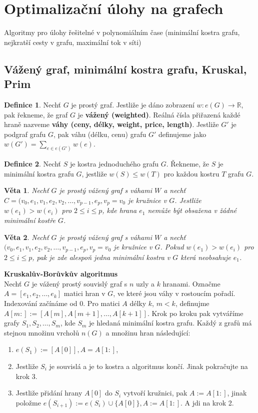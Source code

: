 \documentclass[a4]{report}
\newtheorem{theorem}{Věta}
\theoremstyle{definition}
\newtheorem{definition}{Definice}[section]
\begin{document}
\section{Optimalizační úlohy na grafech}
Algoritmy pro úlohy řešitelné v polynomiálním čase (minimální kostra grafu, nejkratší cesty v grafu, maximální tok v síti)
\subsection{Vážený graf, minimální kostra grafu, Kruskal, Prim}

\begin{definition}
Nechť $G$ je prostý graf. Jestliže je dáno zobrazení $w: e(G) \rightarrow \mathbb{R}$, pak řekneme, že graf $G$ je \textbf{vážený (weighted)}. Reálná čísla přiřazená každé hraně nazveme \textbf{váhy (ceny, délky, weight, price, length)}. Jestliže $G'$ je podgraf grafu $G$, pak váhu (délku, cenu) grafu $G'$ definujeme jako $w(G') = \sum_{e \in e(G')} w(e)$.
\end{definition}

\begin{definition}
Nechť $S$ je kostra jednoduchého grafu $G$. Řekneme, že $S$ je minimální kostra grafu $G$, jestliže $w(S) \leq w(T)$ pro každou kostru $T$ grafu $G$.
\end{definition}

\begin{theorem}
Nechť $G$ je prostý vážený graf s váhami $W$ a nechť $C = (v_0, e_1, v_1, e_2, v_2, \ldots, v_{p-1}, e_p, v_p = v_0$ je kružnice v $G$. Jestliže $w(e_1) > w(e_i)$ pro $2\leq i \leq p$, kde hrana $e_1$ nemůže být obsažena v žádné minimální kostře $G$.
\end{theorem}

\begin{theorem}
Nechť $G$ je prostý vážený graf s váhami $W$ a nechť $(v_0, e_1, v_1, e_2, v_2, \ldots, v_{p-1}, e_p, v_p = v_0$ je kružnice v $G$. Pokud $w(e_1) > w(e_i)$ pro $2\leq i \leq p$, pak je zde alespoň jedna minimální kostra v $G$ která neobsahuje $e_1$.
\end{theorem}
\textbf{Kruskalův-Borůvkův algoritmus}\\
Nechť $G$ je vážený prostý souvislý graf s $n$ uzly a $k$ hranami. Označme $A = [e_1, e_2, \ldots, e_k ]$ matici hran v $G$, ve které jsou váhy v rostoucím pořadí. Indexování začínáme od 0. Pro matici $A$ délky $k$, $m<k$, definujme $A[m:] := [A[m], A[m+1], \ldots, A[k+1]]$. Krok po kroku pak vytváříme grafy $S_1, S_2, \ldots, S_m$, kde $S_m$ je hledaná minimální kostra grafu. Každý z grafů má stejnou množinu vrcholů $n(G)$ a množinu hran následující:
\begin{enumerate}
    \item $e(S_1) := [A[0]], A = A[1:]$,
    \item Jestliže $S_i$ je souvislá a je to kostra a algoritmus končí. Jinak pokračujte na krok $3$.
    \item Jestliže přidání hrany $A[0]$ do $S_i$ vytvoří kružnici, pak $A := A[1:]$, jinak položme $e(S_{i+1}) := e(S_i) \cup \{ A[0] \}, A:= A[1:]$. A jdi na krok 2.
\end{enumerate}
\end{document}
